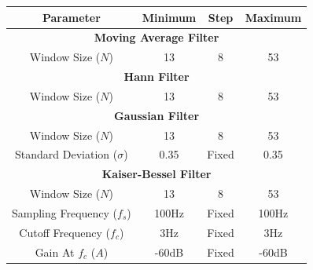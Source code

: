         \begin{center}
            \label{tbl_filtering}
            \begin{tabular}{|c|c|c|c|}
                \hline
                Parameter & Minimum & Step & Maximum \\
                \hline
                \multicolumn{4}{|c|}{\textbf{Moving Average Filter}} \\
                \hline
                Window Size ($N$) & 13 & 8 & 53 \\
                \hline
                \multicolumn{4}{|c|}{\textbf{Hann Filter}} \\
                \hline
                Window Size ($N$) & 13 & 8 & 53 \\
                \hline
                \multicolumn{4}{|c|}{\textbf{Gaussian Filter}} \\
                \hline
                Window Size ($N$) & 13 & 8 & 53 \\
                Standard Deviation ($\sigma$) & 0.35 & Fixed & 0.35 \\
                \hline
                \multicolumn{4}{|c|}{\textbf{Kaiser-Bessel Filter}} \\
                \hline
                Window Size ($N$) & 13 & 8 & 53 \\
                Sampling Frequency ($f_s$) & 100Hz & Fixed & 100Hz \\
                Cutoff Frequency ($f_c$) & 3Hz & Fixed & 3Hz \\
                Gain At $f_c$ ($A$) & -60dB & Fixed & -60dB \\
                \hline
            \end{tabular}
        \end{center}

